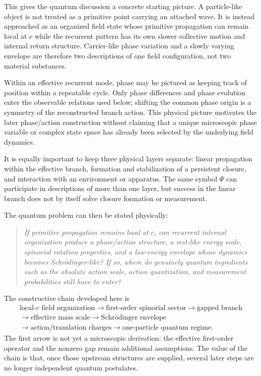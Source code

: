 \documentclass[11pt]{article}
\theoremstyle{definition}
\begin{document}
This gives the quantum discussion a concrete starting picture.  A particle-like object is not
treated as a primitive point carrying an attached wave.  It is instead approached as an
organized field state whose primitive propagation can remain local at $c$ while the recurrent
pattern has its own slower collective motion and internal return structure.  Carrier-like phase
variation and a slowly varying envelope are therefore two descriptions of one field
configuration, not two material substances.

Within an effective recurrent mode, phase may be pictured as keeping track of position within a
repeatable cycle.  Only phase differences and phase evolution enter the observable relations
used below; shifting the common phase origin is a symmetry of the reconstructed branch action.
This physical picture motivates the later phase/action construction without claiming that a
unique microscopic phase variable or complex state space has already been selected by the
underlying field dynamics.

It is equally important to keep three physical layers separate: linear propagation within the
effective branch, formation and stabilization of a persistent closure, and interaction with an
environment or apparatus.  The same symbol $\Psi$ can participate in descriptions of more than
one layer, but success in the linear branch does not by itself solve closure formation or
measurement.

The quantum problem can then be stated physically:
\begin{quote}
\emph{If primitive propagation remains local at $c$, can recurrent internal organization
produce a phase/action structure, a rest-like energy scale, spinorial rotation properties,
and a low-energy envelope whose dynamics becomes Schrödinger-like?  If so, where do genuinely
quantum ingredients such as the absolute action scale, action quantization, and measurement
probabilities still have to enter?}
\end{quote}

The constructive chain developed here is
\begin{equation}
\boxed{
\begin{gathered}
\text{local-$c$ field organization}
\longrightarrow
\text{first-order spinorial sector}
\longrightarrow
\text{gapped branch}\\
\longrightarrow
\text{effective mass scale}
\longrightarrow
\text{Schrödinger envelope}\\
\longrightarrow
\text{action/translation charges}
\longrightarrow
\text{one-particle quantum regime.}
\end{gathered}}
\label{eq:readerchain}
\end{equation}
The first arrow is not yet a microscopic derivation: the effective first-order operator and
the nonzero gap remain additional assumptions.  The value of the chain is that, once those
upstream structures are supplied, several later steps are no longer independent quantum
postulates.
\end{document}
